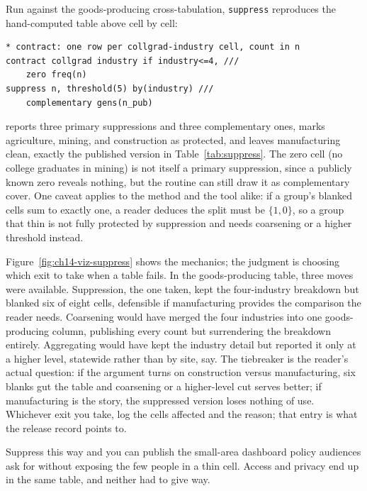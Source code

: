Run against the goods-producing cross-tabulation, \texttt{suppress} reproduces the hand-computed table above cell by cell:
\par
{\footnotesize
\begin{verbatim}
* contract: one row per collgrad-industry cell, count in n
contract collgrad industry if industry<=4, ///
    zero freq(n)
suppress n, threshold(5) by(industry) ///
    complementary gens(n_pub)
\end{verbatim}
}
reports three primary suppressions and three complementary ones, marks agriculture, mining, and construction as protected, and leaves manufacturing clean, exactly the published version in Table~\ref{tab:suppress}. The zero cell (no college graduates in mining) is not itself a primary suppression, since a publicly known zero reveals nothing, but the routine can still draw it as complementary cover. One caveat applies to the method and the tool alike: if a group's blanked cells sum to exactly one, a reader deduces the split must be $\{1,0\}$, so a group that thin is not fully protected by suppression and needs coarsening or a higher threshold instead.

Figure~\ref{fig:ch14-viz-suppress} shows the mechanics; the judgment is choosing which exit to take when a table fails. In the goods-producing table, three moves were available. Suppression, the one taken, kept the four-industry breakdown but blanked six of eight cells, defensible if manufacturing provides the comparison the reader needs. Coarsening would have merged the four industries into one goods-producing column, publishing every count but surrendering the breakdown entirely. Aggregating would have kept the industry detail but reported it only at a higher level, statewide rather than by site, say. The tiebreaker is the reader's actual question: if the argument turns on construction versus manufacturing, six blanks gut the table and coarsening or a higher-level cut serves better; if manufacturing is the story, the suppressed version loses nothing of use. Whichever exit you take, log the cells affected and the reason; that entry is what the release record points to.

Suppress this way and you can publish the small-area dashboard policy audiences ask for without exposing the few people in a thin cell. Access and privacy end up in the same table, and neither had to give way.


